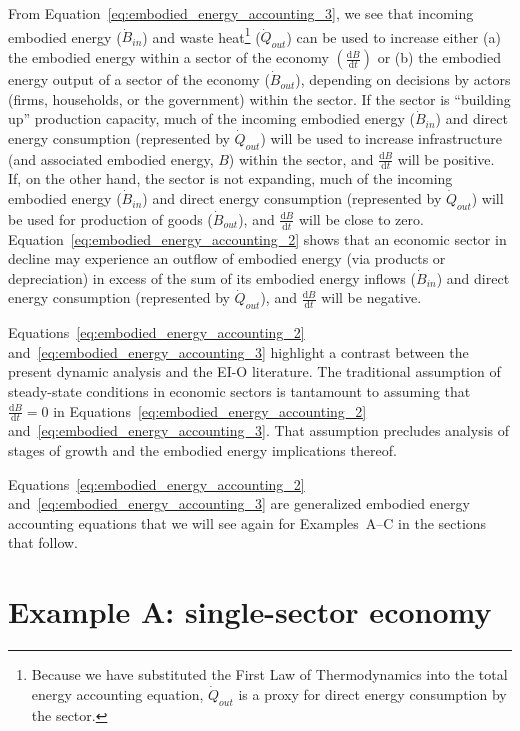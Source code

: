 \noindent From Equation~\ref{eq:embodied_energy_accounting_3},
we see that incoming embodied energy ($\dot{B}_{in}$) and 
waste heat\footnote{Because we have substituted 
the First Law of Thermodynamics into the total energy accounting equation,
$\dot{Q}_{out}$ is a proxy for direct energy consumption by the sector.} 
($\dot{Q}_{out}$) can be used to increase either (a)
the embodied energy within a sector of the economy 
$\left( \frac{\mathrm{d}B}{\mathrm{d}t}  \right)$
or (b) the embodied energy output of a sector of the economy 
($\dot{B}_{out}$), 
depending on decisions by actors 
(firms, households, or the government) 
within the sector. 
If the sector is ``building up'' production capacity, 
much of the incoming embodied energy ($\dot{B}_{in}$)
and direct energy consumption (represented by $\dot{Q}_{out}$)
will be used to increase infrastructure 
(and associated embodied energy, $B$) within the sector, 
and $\frac{\mathrm{d}B}{\mathrm{d}t}$ will be positive.
If, on the other hand, the sector is not expanding, 
much of the incoming embodied energy ($\dot{B}_{in}$)
and direct energy consumption (represented by $\dot{Q}_{out}$)
will be used for production of goods ($\dot{B}_{out}$),
and $\frac{\mathrm{d}B}{\mathrm{d}t}$ will be close to zero.
Equation~\ref{eq:embodied_energy_accounting_2} shows that
an economic sector in decline may experience an outflow 
of embodied energy (via products or depreciation)
in excess of the sum of 
its embodied energy inflows ($\dot{B}_{in}$)
and direct energy consumption (represented by $\dot{Q}_{out}$),
and $\frac{\mathrm{d}B}{\mathrm{d}t}$ will be negative.

Equations~\ref{eq:embodied_energy_accounting_2}
and~\ref{eq:embodied_energy_accounting_3} 
highlight a contrast between 
the present dynamic analysis and the EI-O literature.
The traditional assumption of steady-state conditions 
in economic sectors is tantamount to assuming that
$\frac{\mathrm{d}B}{\mathrm{d}t} = 0$ in 
Equations~\ref{eq:embodied_energy_accounting_2}
and~\ref{eq:embodied_energy_accounting_3}.
That assumption precludes analysis of stages of growth 
and the embodied energy implications thereof.

Equations~\ref{eq:embodied_energy_accounting_2}
and~\ref{eq:embodied_energy_accounting_3} 
are generalized embodied energy accounting equations that we will
see again for Examples~A--C in the sections that follow. %


\section{Example A: single-sector economy} %
\label{sec:Embodied_Energy_Example_A}

